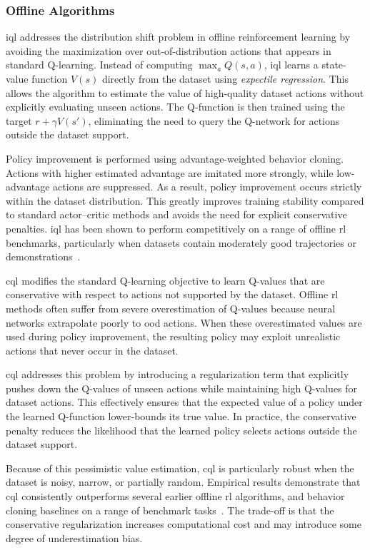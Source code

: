 \subsubsection{Offline Algorithms}

\gls{iql} addresses the distribution shift problem in offline reinforcement learning by avoiding the maximization over out-of-distribution actions that appears in standard Q-learning.
Instead of computing $\max_a Q(s,a)$, \gls{iql} learns a state-value function $V(s)$ directly from the dataset using \emph{expectile regression}.
This allows the algorithm to estimate the value of high-quality dataset actions without explicitly evaluating unseen actions.
The Q-function is then trained using the target $r + \gamma V(s')$, eliminating the need to query the Q-network for actions outside the dataset support.

Policy improvement is performed using advantage-weighted behavior cloning.
Actions with higher estimated advantage are imitated more strongly, while low-advantage actions are suppressed.
As a result, policy improvement occurs strictly within the dataset distribution.
This greatly improves training stability compared to standard actor–critic methods and avoids the need for explicit conservative penalties. \gls{iql} has been shown to perform competitively on a range of offline \gls{rl} benchmarks, particularly when datasets contain moderately good trajectories or demonstrations~\cite{Kostrikov2021}.

\vspace{0.5em}

\gls{cql} modifies the standard Q-learning objective to learn Q-values that are conservative with respect to actions not supported by the dataset.
Offline \gls{rl} methods often suffer from severe overestimation of Q-values because neural networks extrapolate poorly to \gls{ood} actions.
When these overestimated values are used during policy improvement, the resulting policy may exploit unrealistic actions that never occur in the dataset.

\gls{cql} addresses this problem by introducing a regularization term that explicitly pushes down the Q-values of unseen actions while maintaining high Q-values for dataset actions.
This effectively ensures that the expected value of a policy under the learned Q-function lower-bounds its true value.
In practice, the conservative penalty reduces the likelihood that the learned policy selects actions outside the dataset support.

Because of this pessimistic value estimation, \gls{cql} is particularly robust when the dataset is noisy, narrow, or partially random.
Empirical results demonstrate that \gls{cql} consistently outperforms several earlier offline \gls{rl} algorithms, and behavior cloning baselines on a range of benchmark tasks~\cite{kumar2020}.
The trade-off is that the conservative regularization increases computational cost and may introduce some degree of underestimation bias.


